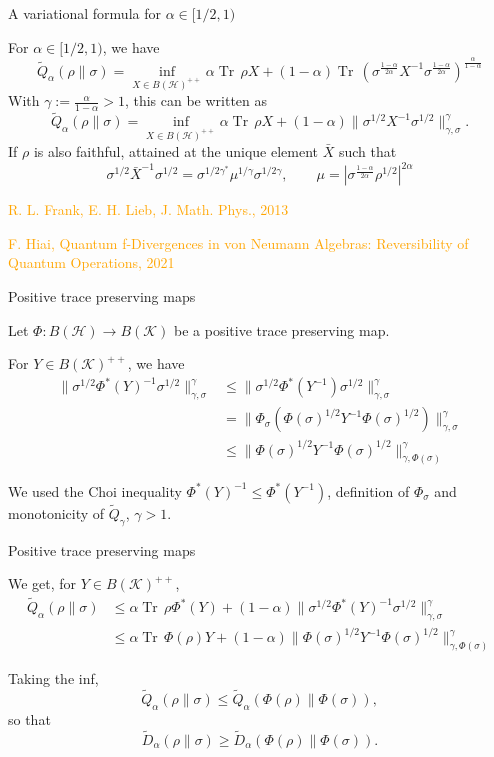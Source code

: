 \documentclass[mathserif]{beamer}
\newcommand{\<}{\langle}
\renewcommand{\>}{\rangle}
\newcommand{\Tr}{\operatorname{Tr}\,}
\newcommand{\Ha}{\mathcal H}
\newcommand{\Ka}{\mathcal K}
\begin{document}
\begin{frame}{A variational formula for $\alpha\in [1/2,1)$}

For $\alpha\in [1/2,1)$, we have 
\[
\tilde Q_\alpha(\rho\|\sigma)=\inf_{X\in B(\Ha)^{++}} \alpha \Tr \rho X +(1-\alpha)\Tr
\left(\sigma^{\frac{1-\alpha}{2\alpha}}X^{-1}\sigma^{\frac{1-\alpha}{2\alpha}}\right)^{\frac{\alpha}{1-\alpha}}
\]
With $\gamma:=\frac{\alpha}{1-\alpha}>1$, this can be written as
\[
\tilde Q_\alpha(\rho\|\sigma)=\inf_{X\in B(\Ha)^{++}} \alpha \Tr \rho X +(1-\alpha)
\|\sigma^{1/2}X^{-1}\sigma^{1/2}\|^\gamma_{\gamma,\sigma}.
\]
If $\rho$ is also faithful, attained at the unique element $\bar X$ such that
\[
\sigma^{1/2}\bar
X^{-1}\sigma^{1/2}=\sigma^{1/2\gamma^*}\mu^{1/\gamma}\sigma^{1/2\gamma},\qquad
\mu=|\sigma^{\frac{1-\alpha}{2\alpha}}\rho^{1/2}|^{2\alpha}
\]


\vfill
{\footnotesize   
\textcolor{orange}{R. L. Frank, E. H. Lieb, J. Math. Phys., 2013}

\textcolor{orange}{F. Hiai, Quantum f-Divergences in von Neumann Algebras:
Reversibility of Quantum Operations, 2021}
}



\end{frame}


\begin{frame}{Positive trace preserving maps}

Let $\Phi: B(\Ha)\to B(\Ka)$ be  a positive trace preserving map. 

\medskip
For $Y\in B(\Ka)^{++}$, we have
\begin{align*}
\|\sigma^{1/2}\Phi^*(Y)^{-1}\sigma^{1/2}\|_{\gamma,\sigma}^\gamma&\le
\|\sigma^{1/2}\Phi^*(Y^{-1})\sigma^{1/2}\|^\gamma_{\gamma,\sigma}\\ &=
\|\Phi_\sigma(\Phi(\sigma)^{1/2}Y^{-1}\Phi(\sigma)^{1/2})\|^\gamma_{\gamma,\sigma}\\
&\le \|\Phi(\sigma)^{1/2}Y^{-1}\Phi(\sigma)^{1/2}\|^\gamma_{\gamma,\Phi(\sigma)}
\end{align*}

We used the Choi inequality $\Phi^*(Y)^{-1}\le \Phi^*(Y^{-1})$, definition of
$\Phi_\sigma$ and monotonicity of $\tilde Q_\gamma$, $\gamma>1$.

\end{frame}

\begin{frame}{Positive trace preserving maps}

We get, for $Y\in B(\Ka)^{++}$,
\begin{align*}
\tilde Q_\alpha(\rho\|\sigma)&\le \alpha \Tr
\rho\Phi^*(Y)+(1-\alpha)\|\sigma^{1/2}\Phi^*(Y)^{-1}\sigma^{1/2}\|^\gamma_{\gamma,\sigma}\\
&\le
\alpha\Tr\Phi(\rho)Y+(1-\alpha)\|\Phi(\sigma)^{1/2}Y^{-1}\Phi(\sigma)^{1/2}\|^\gamma_{\gamma,\Phi(\sigma)}
\end{align*}

Taking the inf,
\[
\tilde Q_\alpha(\rho\|\sigma)\le \tilde Q_\alpha(\Phi(\rho)\|\Phi(\sigma)),
\]
so that
\[
\tilde D_\alpha(\rho\|\sigma)\ge \tilde D_\alpha(\Phi(\rho)\|\Phi(\sigma)).
\]


\end{frame}
\end{document}

